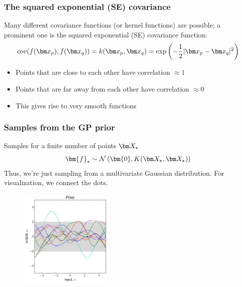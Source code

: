\begin{frame}
\frametitle{The squared exponential (SE) covariance}
Many different covariance functions (or \alert{kernel functions}) are possible; a prominent one is the squared
exponential (SE) covariance function:
\renewcommand\theequation{2.\thedefcounter}
\setcounter{defcounter}{16}
\begin{equation}
cov(f(\bx_p), f(\bx_q)) = k(\bx_p, \bx_q) = \exp \left(-\frac{1}{2} |\bx_p - \bx_q|^2 \right)
\end{equation}
\begin{itemize}
  \item Points that are close to each other have correlation $\approx 1$
  \item Points that are far away from each other have correlation $\approx 0$
  \item This gives rise to very smooth functions
\end{itemize}
\end{frame}

\begin{frame}
\frametitle{Samples from the GP prior}
Samples for a finite number of points $\bX_{\star}$
\begin{equation*}
\bm{f}_{\star} \sim \norm \left(\bm{0}, K( \bX_{\star}, \bX_{\star} )\right)
\end{equation*}
Thus, we're just sampling from a multivariate Gaussian distribution. For visualization, we connect the dots.

\begin{figure}
    \includegraphics[width=0.4\textwidth]{images/plots/fct_space_prior_wo_noise.pdf}
\end{figure}

\end{frame}


